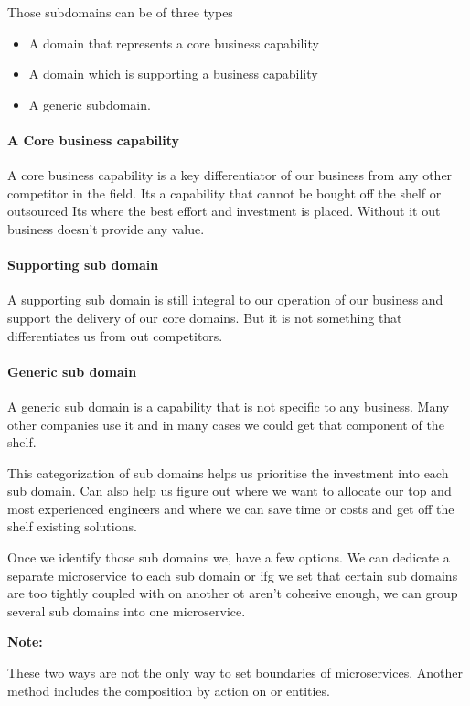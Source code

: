 \documentclass[a4paper, 11pt]{book}
\newenvironment{note}{
    \begin{siderule}
        \textbf{Note: }
        }{
    \end{siderule}}
\begin{document}
    Those subdomains can be of three types
    \begin{itemize}
    \item A domain that represents a core business capability
    \item A domain which is supporting a business capability
    \item A generic subdomain.
    \end{itemize}

    \paragraph{A Core business capability}
    A core business capability is a key differentiator of our business from any other competitor in the field.
    Its a capability that cannot be bought off the shelf or outsourced
    Its where the best effort and investment is placed.
    Without it out business doesn't provide any value.

    \paragraph{Supporting sub domain}
    A supporting sub domain is still integral to our operation of our business and support the delivery of our core domains.
    But it is not something that differentiates us from out competitors.

    \paragraph{Generic sub domain}
    A generic sub domain is a capability that is not specific to any business.
    Many other companies use it and in many cases we could get that component of the shelf.

    This categorization of sub domains helps us prioritise the investment into each sub domain.
    Can also help us figure out where we want to allocate our top and most experienced engineers and where we can save time or costs and get off the shelf existing solutions.

    Once we identify those sub domains we, have a few options.
    We can dedicate a separate microservice to each sub domain or ifg we set that certain sub domains are too tightly coupled with on another ot aren't cohesive enough, we can group several sub domains into one microservice.

    \begin{note}
    These two ways are not the only way to set boundaries of microservices.
    Another method includes the composition by action on or entities.
    \end{note}
\end{document}
